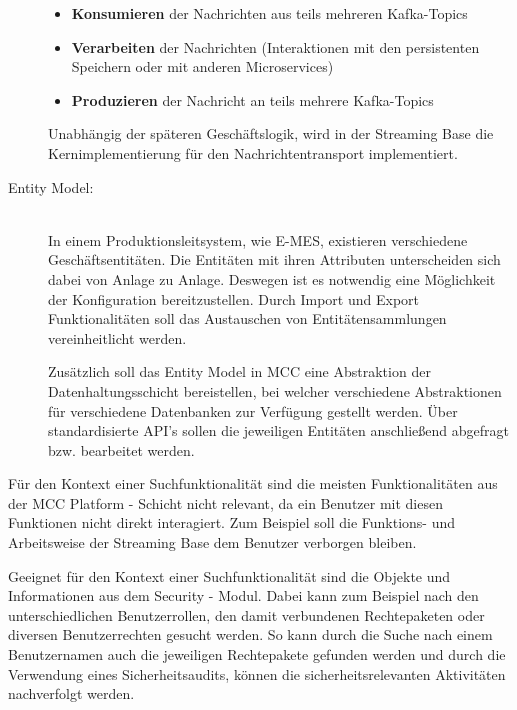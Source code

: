 \begin{description}
    \begin{itemize}
        \item \textbf{Konsumieren} der Nachrichten aus teils mehreren Kafka-Topics
        \item \textbf{Verarbeiten} der Nachrichten (Interaktionen mit den persistenten Speichern oder mit anderen Microservices)
        \item \textbf{Produzieren} der Nachricht an teils mehrere Kafka-Topics
    \end{itemize}

    Unabhängig der späteren Geschäftslogik, wird in der \glqq Streaming Base\grqq{} die Kernimplementierung für den Nachrichtentransport implementiert.
    
    \item[Entity Model:]\hfill \\
    In einem Produktionsleitsystem, wie \glqq E-MES\grqq{}, existieren verschiedene Geschäftsentitäten. Die Entitäten mit ihren Attributen unterscheiden sich dabei von Anlage zu Anlage. Deswegen ist es notwendig eine Möglichkeit der Konfiguration bereitzustellen. Durch Import und Export Funktionalitäten soll das Austauschen von Entitätensammlungen vereinheitlicht werden.

    Zusätzlich soll das Entity Model in MCC eine Abstraktion der Datenhaltungsschicht bereistellen, bei welcher verschiedene Abstraktionen für verschiedene Datenbanken zur Verfügung gestellt werden. Über standardisierte API's sollen die jeweiligen Entitäten anschließend abgefragt bzw. bearbeitet werden.

\end{description}

Für den Kontext einer Suchfunktionalität sind die meisten Funktionalitäten aus der \glqq MCC Platform\grqq{} - Schicht nicht relevant, da ein Benutzer mit diesen Funktionen nicht direkt interagiert. Zum Beispiel soll die Funktions- und Arbeitsweise der \glqq Streaming Base\grqq{} dem Benutzer verborgen bleiben.

Geeignet für den Kontext einer Suchfunktionalität sind die Objekte und Informationen aus dem \glqq Security\grqq{} - Modul. Dabei kann zum Beispiel nach den unterschiedlichen Benutzerrollen, den damit verbundenen Rechtepaketen oder diversen Benutzerrechten gesucht werden. So kann durch die Suche nach einem Benutzernamen auch die jeweiligen Rechtepakete gefunden werden und durch die Verwendung eines Sicherheitsaudits, können die sicherheitsrelevanten Aktivitäten nachverfolgt werden.

